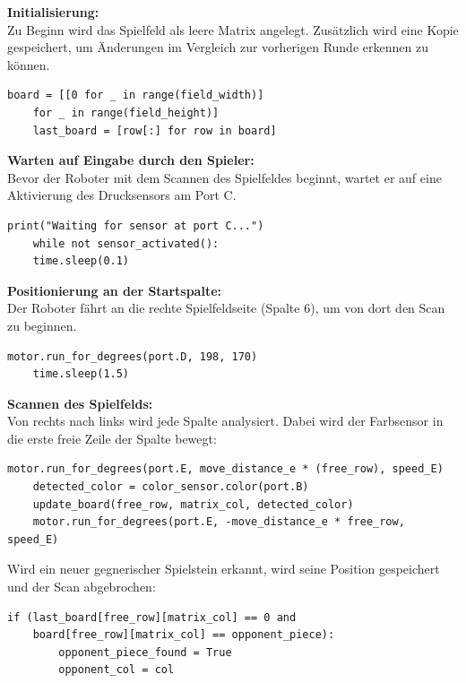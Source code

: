 \textbf{Initialisierung:}\\
Zu Beginn wird das Spielfeld als leere Matrix angelegt. Zusätzlich wird eine Kopie gespeichert, um Änderungen im Vergleich zur vorherigen Runde erkennen zu können.

\begin{lstlisting}[style=pythonstyle]
	board = [[0 for _ in range(field_width)] 
	for _ in range(field_height)]
	last_board = [row[:] for row in board]
\end{lstlisting}

\textbf{Warten auf Eingabe durch den Spieler:}\\
Bevor der Roboter mit dem Scannen des Spielfeldes beginnt, wartet er auf eine Aktivierung des Drucksensors am Port C.

\begin{lstlisting}[style=pythonstyle]
	print("Waiting for sensor at port C...")
	while not sensor_activated():
	time.sleep(0.1)
\end{lstlisting}

\textbf{Positionierung an der Startspalte:}\\
Der Roboter fährt an die rechte Spielfeldseite (Spalte 6), um von dort den Scan zu beginnen.

\begin{lstlisting}[style=pythonstyle]
	motor.run_for_degrees(port.D, 198, 170)
	time.sleep(1.5)
\end{lstlisting}

\textbf{Scannen des Spielfelds:}\\
Von rechts nach links wird jede Spalte analysiert. Dabei wird der Farbsensor in die erste freie Zeile der Spalte bewegt:

\begin{lstlisting}[style=pythonstyle]
	motor.run_for_degrees(port.E, move_distance_e * (free_row), speed_E)
	detected_color = color_sensor.color(port.B)
	update_board(free_row, matrix_col, detected_color)
	motor.run_for_degrees(port.E, -move_distance_e * free_row, speed_E)
\end{lstlisting}

Wird ein neuer gegnerischer Spielstein erkannt, wird seine Position gespeichert und der Scan abgebrochen:

\begin{lstlisting}[style=pythonstyle]
	if (last_board[free_row][matrix_col] == 0 and
	board[free_row][matrix_col] == opponent_piece):
		opponent_piece_found = True
		opponent_col = col
\end{lstlisting}

